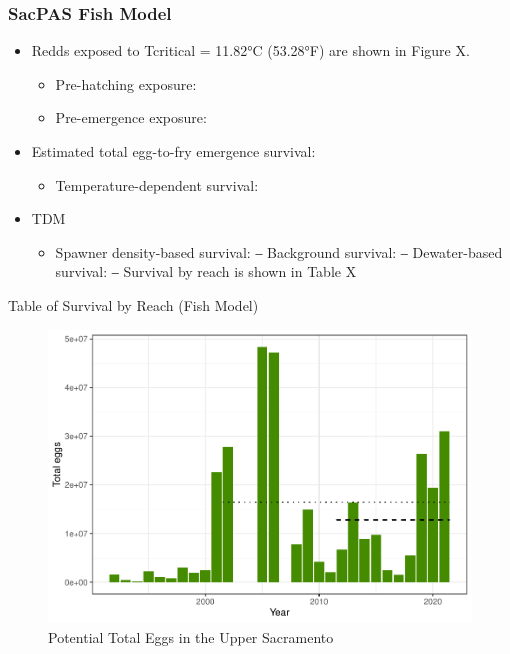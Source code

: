 \documentclass[
]{book}
\providecommand{\tightlist}{%
  \setlength{\itemsep}{0pt}\setlength{\parskip}{0pt}}
\theoremstyle{definition}
\theoremstyle{definition}
\theoremstyle{definition}
\theoremstyle{definition}
\theoremstyle{remark}
\begin{document}
\hypertarget{sacpas-fish-model}{%
\subsubsection{SacPAS Fish Model}\label{sacpas-fish-model}}

\begin{itemize}
\tightlist
\item
  Redds exposed to Tcritical = 11.82°C (53.28°F) are shown in Figure X.

  \begin{itemize}
  \tightlist
  \item
    Pre-hatching exposure:
  \item
    Pre-emergence exposure:
  \end{itemize}
\item
  Estimated total egg-to-fry emergence survival:

  \begin{itemize}
  \tightlist
  \item
    Temperature-dependent survival:
  \end{itemize}
\item
  TDM

  \begin{itemize}
  \tightlist
  \item
    Spawner density-based survival:
    ‒ Background survival:
    ‒ Dewater-based survival:
    ‒ Survival by reach is shown in Table X
  \end{itemize}
\end{itemize}

Table of Survival by Reach (Fish Model)

\begin{figure}
\centering
\includegraphics{_main_files/figure-latex/totaleggs-fig-1.pdf}
\caption{\label{fig:totaleggs-fig}Potential Total Eggs in the Upper Sacramento}
\end{figure}
\end{document}
